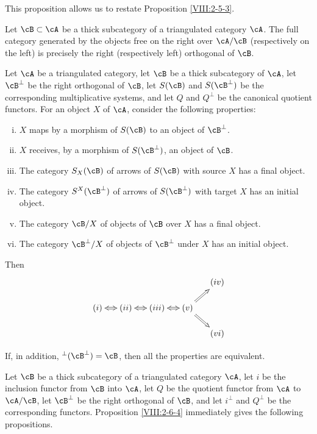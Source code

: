 This proposition allows us to restate Proposition \ref{VIII:2-5-3}.

\begin{proposition}\label{VIII:2-6-3}
Let $\cB\subset\cA$ be a thick subcategory of a triangulated category
$\cA$. The full category generated by the objects free on the right over
$\cA/\cB$ (respectively on the left) is precisely the right
(respectively left) orthogonal of $\cB$.
\end{proposition}

\begin{proposition}\label{VIII:2-6-4}
Let $\cA$ be a triangulated category, let $\cB$ be a thick subcategory of
$\cA$, let $\cB^\bot$ be the right orthogonal of $\cB$, let $S(\cB)$ and
$S(\cB^\bot)$ be the corresponding multiplicative systems, and let $Q$
and $Q^\bot$ be the canonical quotient functors. For an object $X$ of
$\cA$, consider the following properties:
\begin{enumerate}[(i)]
  \item $X$ maps by a morphism of $S(\cB)$ to an object of $\cB^\bot$.
  \item $X$ receives, by a morphism of $S(\cB^\bot)$, an object of
    $\cB$.
  \item The category $S_X(\cB)$ of arrows of $S(\cB)$ with source $X$ has
    a final object.
  \item The category $S^X(\cB^\bot)$ of arrows of $S(\cB^\bot)$ with
    target $X$ has an initial object.
  \item The category $\cB/X$ of objects of $\cB$ over $X$ has a final
    object.
  \item The category $\cB^\bot/X$ of objects of $\cB^\bot$ under $X$ has
    an initial object.
\end{enumerate}
Then
\[\xymatrix@=0.5cm{
  & & & & (iv) \\
  (i) \ar@{<=>}[r]
    & (ii) \ar@{<=>}[r]
    & (iii) \ar@{<=>}[r]
    & (v) \ar@{=>}[ur] \ar@{=>}[dr] \\
  & & & & (vi)
}\]

If, in addition, $^\bot(\cB^\bot)=\cB$, then all the properties are
equivalent.
\end{proposition}

Let $\cB$ be a thick subcategory of a triangulated category $\cA$, let
$i$ be the inclusion functor from $\cB$ into $\cA$, let $Q$ be the
quotient functor from $\cA$ to $\cA/\cB$, let $\cB^\bot$ be the right
orthogonal of $\cB$, and let $i^\bot$ and $Q^\bot$ be the corresponding
functors. Proposition \ref{VIII:2-6-4} immediately gives the following
propositions.

